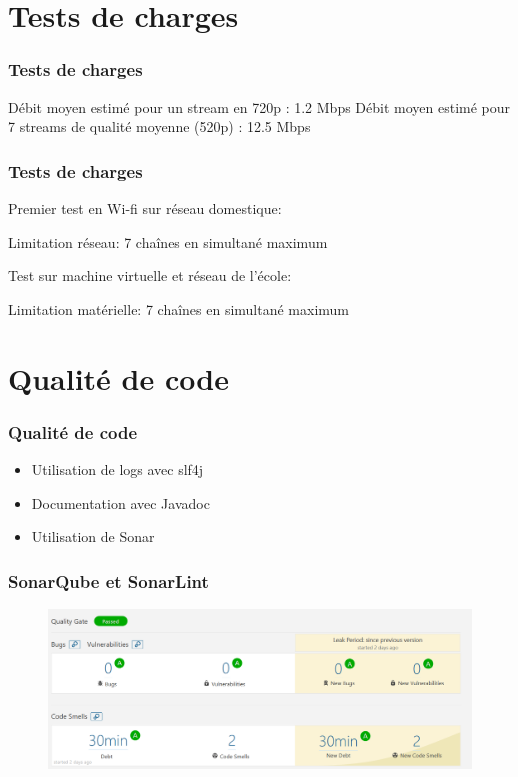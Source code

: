 \documentclass{beamer}
\begin{document}

\section{Tests de charges}

\begin{frame}
\frametitle{Tests de charges}

Débit moyen estimé pour un stream en 720p : 1.2 Mbps
\bigbreak
Débit moyen estimé pour 7 streams de qualité moyenne (520p) : 12.5 Mbps
\end{frame}

\begin{frame}
\frametitle{Tests de charges}

Premier test en Wi-fi sur réseau domestique:

Limitation réseau: 7 chaînes en simultané maximum
\bigbreak

Test sur machine virtuelle et réseau de l'école:

Limitation matérielle: 7 chaînes en simultané maximum

\end{frame}



\section{Qualité de code}

\begin{frame}
\frametitle{Qualité de code}
	\begin{itemize}
		\item Utilisation de logs avec slf4j
		\item Documentation avec Javadoc
		\item Utilisation de Sonar 
	\end{itemize}
\end{frame}


\begin{frame}
\frametitle{SonarQube et SonarLint}

\begin{figure}
	\includegraphics[scale=0.40]{images/sonarresult}
\end{figure}

\end{frame}
\end{document}
